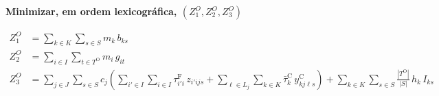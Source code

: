 \documentclass[
    12pt,
    openright,
    oneside,
    a4paper,
    fleqn,
    chapter=TITLE,
    section=TITLE,
    english,
    brazil
]{abntex2}
\begin{document}
\noindent\textbf{Minimizar, em ordem lexicográfica, $(Z^{O}_{1}, Z^{O}_{2}, Z^{O}_{3})$}
\begin{ceqn}
\begin{equation}
\begin{aligned}
Z^{O}_{1} &= \sum_{k \in K}\sum_{s \in S} m_{k}\, b_{ks} \\
Z^{O}_{2} &= \sum_{i \in I}\sum_{t \in T^{\mathrm{O}}} m_{i}\, g_{it} \\
Z^{O}_{3} &= \sum_{j \in J}\sum_{s \in S} c_{j} \left(
        \sum_{i' \in I}\sum_{i \in I} \tau^{\mathrm{F}}_{i'i}\, z_{i'ijs}
        + \sum_{\ell \in L_j}\sum_{k \in K} \bar{\tau}^{\mathrm{C}}_{k}\, y^{\mathrm{C}}_{kj\ell s} \right)
    + \sum_{k \in K}\sum_{s \in S} \frac{|T^{\mathrm{O}}|}{|S|}\, h_{k}\, I_{ks}
\end{aligned}
\label{eq:obj_turno}
\end{equation}
\end{ceqn}
\end{document}
